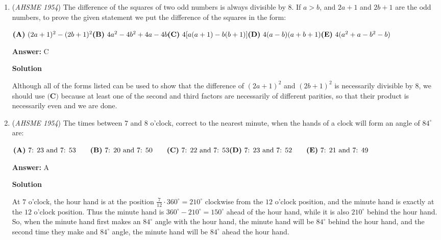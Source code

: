 \begin{enumerate}
 We must now solve for the length of the actual trip. If the train had gone $60\frac{\text{mi}}{\text{hr}}$ for the entire trip, then it would have taken $\frac{D}{60}\text{hr}$, and the train would have been on time. But the trip actually took $1+\frac{D-60}{45}$ hours, not including the half-hour detention, and the train was $3.5$ hours late. Therefore
 \[\frac{D}{60}+3.5=1+\frac{D-60}{45}+0.5\Rightarrow 3D+630=180+4D-240+90\Rightarrow D=600.\]The length of the trip in miles was $\boxed{\textbf{(C)}\ 600}$.

 


	\item (\textit{AHSME 1954}) The difference of the squares of two odd numbers is always divisible by $8$. If $a>b$, and $2a+1$ and $2b+1$ are the odd numbers, 
to prove the given statement we put the difference of the squares in the form: 


 $\textbf{(A)}\ (2a+1)^2-(2b+1)^2\\ \textbf{(B)}\ 4a^2-4b^2+4a-4b\\ \textbf{(C)}\ 4[a(a+1)-b(b+1)]\\ \textbf{(D)}\ 4(a-b)(a+b+1)\\ \textbf{(E)}\ 4(a^2+a-b^2-b)$

 \textbf{Answer: }C



\textbf{Solution}

Although all of the forms listed can be used to show that the difference of $(2a+1)^2$ and $(2b+1)^2$ is necessarily divisible by $8$, we should use $\boxed{\textbf{(C)}}$ because at least one of the second and third factors are necessarily of different parities, so that their product is necessarily even and we are done.

 


	\item (\textit{AHSME 1954}) The times between $7$ and $8$ o'clock, correct to the nearest minute, when the hands of a clock will form an angle of $84^{\circ}$ are: 


 $\textbf{(A)}\ \text{7: 23 and 7: 53}\qquad \textbf{(B)}\ \text{7: 20 and 7: 50}\qquad \textbf{(C)}\ \text{7: 22 and 7: 53}\\  \textbf{(D)}\ \text{7: 23 and 7: 52}\qquad \textbf{(E)}\ \text{7: 21 and 7: 49}$

 \textbf{Answer: }A



\textbf{Solution}

At $7$ o'clock, the hour hand is at the position $\frac{7}{12}\cdot 360^{\circ}=210^{\circ}$ clockwise from the $12$ o'clock position, and the minute hand is exactly at the $12$ o'clock position. Thus the minute hand is $360^{\circ}-210^{\circ}=150^{\circ}$ ahead of the hour hand, while it is also $210^{\circ}$ behind the hour hand. So, when the minute hand first makes an $84^{\circ}$ angle with the hour hand, the minute hand will be $84^{\circ}$ behind the hour hand, and the second time they make and $84^{\circ}$ angle, the minute hand will be $84^{\circ}$ ahead the hour hand.


\end{enumerate}
